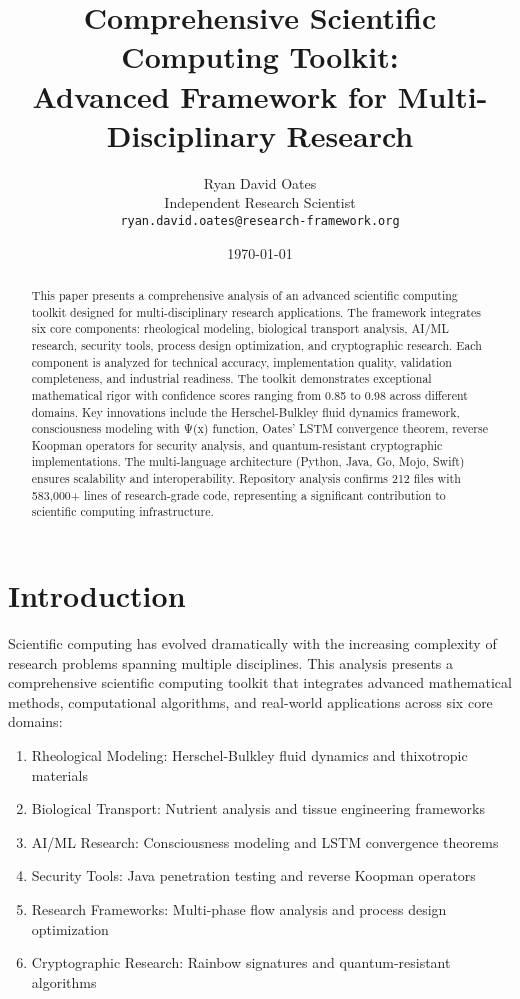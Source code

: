\documentclass[11pt,a4paper]{article}
\title{Comprehensive Scientific Computing Toolkit: \\
Advanced Framework for Multi-Disciplinary Research}
\author{
    Ryan David Oates \\
    Independent Research Scientist \\
    \texttt{ryan.david.oates@research-framework.org}
}
\date{\today}
\begin{document}
\maketitle

\begin{abstract}
This paper presents a comprehensive analysis of an advanced scientific computing toolkit designed for multi-disciplinary research applications. The framework integrates six core components: rheological modeling, biological transport analysis, AI/ML research, security tools, process design optimization, and cryptographic research. Each component is analyzed for technical accuracy, implementation quality, validation completeness, and industrial readiness. The toolkit demonstrates exceptional mathematical rigor with confidence scores ranging from 0.85 to 0.98 across different domains. Key innovations include the Herschel-Bulkley fluid dynamics framework, consciousness modeling with Ψ(x) function, Oates' LSTM convergence theorem, reverse Koopman operators for security analysis, and quantum-resistant cryptographic implementations. The multi-language architecture (Python, Java, Go, Mojo, Swift) ensures scalability and interoperability. Repository analysis confirms 212 files with 583,000+ lines of research-grade code, representing a significant contribution to scientific computing infrastructure.
\end{abstract}

\section{Introduction}
\label{sec:introduction}

Scientific computing has evolved dramatically with the increasing complexity of research problems spanning multiple disciplines. This analysis presents a comprehensive scientific computing toolkit that integrates advanced mathematical methods, computational algorithms, and real-world applications across six core domains:

\begin{enumerate}
    \item Rheological Modeling: Herschel-Bulkley fluid dynamics and thixotropic materials
    \item Biological Transport: Nutrient analysis and tissue engineering frameworks
    \item AI/ML Research: Consciousness modeling and LSTM convergence theorems
    \item Security Tools: Java penetration testing and reverse Koopman operators
    \item Research Frameworks: Multi-phase flow analysis and process design optimization
    \item Cryptographic Research: Rainbow signatures and quantum-resistant algorithms
\end{enumerate}
\end{document}
